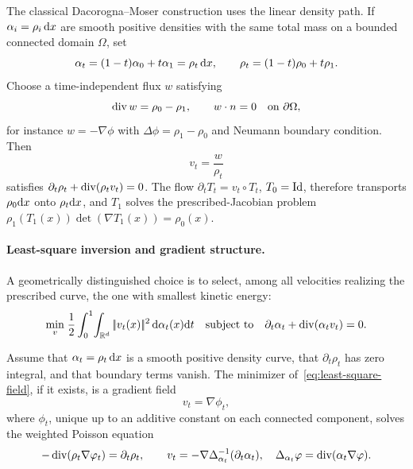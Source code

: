 The classical Dacorogna--Moser construction uses the linear density path. If $\alpha_i=\rho_i\,\mathrm{d} x$ are smooth positive densities with the same total mass on a bounded connected domain $\Omega$, set
\[
	\alpha_t=(1-t)\alpha_0+t\alpha_1=\rho_t\,\mathrm{d} x,
	\qquad
	\rho_t=(1-t)\rho_0+t\rho_1.
\]
Choose a time-independent flux $w$ satisfying
\[
	\operatorname{div} w=\rho_0-\rho_1,
	\qquad
	w\cdot n=0\quad\hbox{on }\partial\Omega,
\]
for instance $w=-\nabla\phi$ with $\Delta\phi=\rho_1-\rho_0$ and Neumann boundary condition. Then
\[
	v_t=\frac{w}{\rho_t}
\]
satisfies $\partial_t\rho_t+\operatorname{div}(\rho_t v_t)=0$. The flow
$\partial_t T_t=v_t\circ T_t$, $T_0=\mathrm{Id}$, therefore transports
$\rho_0\mathrm{d} x$ onto $\rho_t\mathrm{d} x$, and $T_1$ solves the prescribed-Jacobian problem
$\rho_1(T_1(x))\det(\nabla T_1(x))=\rho_0(x)$.

\paragraph{Least-square inversion and gradient structure.}

A geometrically distinguished choice is to select, among all velocities realizing the prescribed curve, the one with smallest kinetic energy:
\begin{equation}\label{eq:least-square-field}
	\underset{v}{\min}\;
	\frac12\int_0^1\!\int_{\mathbb{R}^d}|\!| v_t(x) |\!|^2\,\mathrm{d}\alpha_t(x)\mathrm{d} t
	\quad
	\text{subject to}
	\quad
	\partial_t\alpha_t+\operatorname{div}(\alpha_t v_t)=0.
\end{equation}

\begin{prop}\label{prop-least-square-gradient-velocity}
	Assume that $\alpha_t=\rho_t\,\mathrm{d} x$ is a smooth positive density curve, that $\partial_t\rho_t$ has zero integral, and that boundary terms vanish. The minimizer of~\eqref{eq:least-square-field}, if it exists, is a gradient field
	\[
		v_t=\nabla\phi_t,
	\]
	where $\phi_t$, unique up to an additive constant on each connected component, solves the weighted Poisson equation
	\begin{equation}\label{eq:least-square-field-explicit}
		-\operatorname{div}(\rho_t\nabla\varphi_t)=\partial_t\rho_t,
		\qquad
		v_t=-\nabla\Delta_{\alpha_t}^{-1}(\partial_t\alpha_t),
		\quad
		\Delta_{\alpha_t}\varphi=\operatorname{div}(\alpha_t\nabla\varphi).
	\end{equation}
\end{prop}

